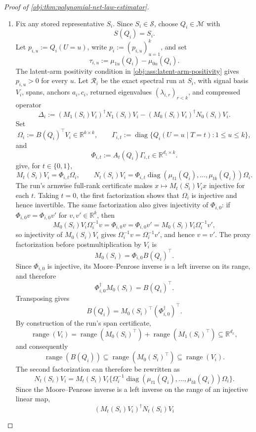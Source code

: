 \documentclass[11pt]{article}
\begin{document}
\begin{proof}[Proof of \cref{obj:thm:polynomial-net-law-estimator}]
\begin{enumerate}
\item Fix any stored representative \(S_i\).  Since \(S_i\in\mathscr S\), choose
\(Q_i\in\mathcal M\) with
\[
S(Q_i)=S_i.
\]
Let \(p_{i,u}:=Q_i(U=u)\), write \(p_i:=(p_{i,u})_{u=1}^k\), and set
\[
\tau_{i,u}:=\mu_{1u}(Q_i)-\mu_{0u}(Q_i).
\]
The latent-arm positivity condition in \cref{obj:ass:latent-arm-positivity}
gives \(p_{i,u}>0\) for every \(u\).  Let \(\mathcal R_i\) be the exact
spectral run at \(S_i\), with signal basis \(V_i\), spans, anchors \(a_i,c_i\),
returned eigenvalues \((\lambda_{i,r})_{r<k}\), and compressed operator
\[
\Delta_i
:=(M_1(S_i)V_i)^\dagger N_1(S_i)V_i
 -(M_0(S_i)V_i)^\dagger N_0(S_i)V_i .
\]
Set
\[
\Omega_i:=B(Q_i)^\top V_i\in\mathbb R^{k\times k},
\qquad
\Gamma_{i,t}
:=\operatorname{diag}\{Q_i(U=u\mid T=t):1\le u\le k\},
\]
and
\[
\Phi_{i,t}:=A_t(Q_i)\Gamma_{i,t}\in\mathbb R^{d_z\times k}.
\]
give, for \(t\in\{0,1\}\),
\[
M_t(S_i)V_i=\Phi_{i,t}\Omega_i,
\qquad
N_t(S_i)V_i
=\Phi_{i,t}
\operatorname{diag}(\mu_{t1}(Q_i),\ldots,\mu_{tk}(Q_i))\Omega_i .
\]
The run's armwise full-rank certificate makes
\(x\mapsto M_t(S_i)V_ix\) injective for each \(t\).  Taking \(t=0\), the first
factorization shows that \(\Omega_i\) is injective and hence invertible.  The
same factorization also gives injectivity of \(\Phi_{i,0}\): if
\(\Phi_{i,0}v=\Phi_{i,0}v'\) for \(v,v'\in\mathbb R^k\), then
\[
M_0(S_i)V_i\Omega_i^{-1}v
=
\Phi_{i,0}v
=
\Phi_{i,0}v'
=
M_0(S_i)V_i\Omega_i^{-1}v',
\]
so injectivity of \(M_0(S_i)V_i\) gives
\(\Omega_i^{-1}v=\Omega_i^{-1}v'\), and hence \(v=v'\).  The proxy
factorization before postmultiplication by \(V_i\) is
\[
M_0(S_i)=\Phi_{i,0}B(Q_i)^\top .
\]
Since \(\Phi_{i,0}\) is injective, its Moore--Penrose inverse is a left inverse
on its range, and therefore
\[
\Phi_{i,0}^\dagger M_0(S_i)=B(Q_i)^\top .
\]
Transposing gives
\[
B(Q_i)=M_0(S_i)^\top(\Phi_{i,0}^\dagger)^\top .
\]
By construction of the run's span certificate,
\[
\operatorname{range}(V_i)
=
\operatorname{range}(M_0(S_i)^\top)+\operatorname{range}(M_1(S_i)^\top)
\subseteq\mathbb R^{d_x},
\]
and consequently
\[
\operatorname{range}(B(Q_i))
\subseteq
\operatorname{range}(M_0(S_i)^\top)
\subseteq
\operatorname{range}(V_i).
\]
The second factorization can therefore be rewritten as
\[
N_t(S_i)V_i
=
M_t(S_i)V_i
\{\Omega_i^{-1}
\operatorname{diag}(\mu_{t1}(Q_i),\ldots,\mu_{tk}(Q_i))\Omega_i\}.
\]
Since the Moore--Penrose inverse is a left inverse on the range of an injective
linear map,
\[
(M_t(S_i)V_i)^\dagger N_t(S_i)V_i
\]
\end{enumerate}
\end{proof}
\end{document}
